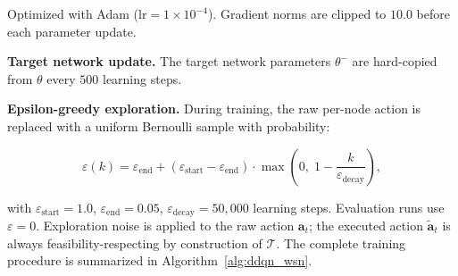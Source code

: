 \documentclass[journal]{IEEEtran}
\begin{document}
Optimized with Adam ($\text{lr} = 1 \times 10^{-4}$). Gradient norms
are clipped to $10.0$ before each parameter update.

\textbf{Target network update.} The target network parameters
$\theta^-$ are hard-copied from $\theta$ every $500$ learning steps.

\textbf{Epsilon-greedy exploration.} During training, the raw per-node
action is replaced with a uniform Bernoulli sample with probability:

\begin{equation}
  \varepsilon(k) = \varepsilon_{\text{end}} +
  (\varepsilon_{\text{start}} - \varepsilon_{\text{end}}) \cdot
  \max\!\left(0,\; 1 - \frac{k}{\varepsilon_{\text{decay}}}\right),
  \label{eq:epsilon}
\end{equation}

with $\varepsilon_{\text{start}} = 1.0$,
$\varepsilon_{\text{end}} = 0.05$,
$\varepsilon_{\text{decay}} = 50{,}000$ learning steps. Evaluation runs
use $\varepsilon = 0$. Exploration noise is applied to the raw action
$\mathbf{a}_t$; the executed action $\tilde{\mathbf{a}}_t$ is always
feasibility-respecting by construction of $\mathcal{T}$. The complete
training procedure is summarized in Algorithm~\ref{alg:ddqn_wsn}.
\end{document}
